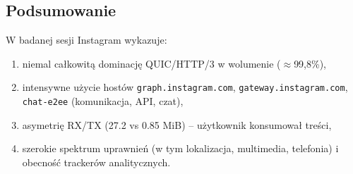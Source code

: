 \subsection{Podsumowanie}
W badanej sesji Instagram wykazuje:
\begin{enumerate}
\item niemal całkowitą dominację QUIC/HTTP/3 w wolumenie ($\approx$99,8\%),
\item intensywne użycie hostów \texttt{graph.instagram.com}, \texttt{gateway.instagram.com}, \texttt{chat-e2ee} (komunikacja, API, czat),
\item asymetrię RX/TX (27.2 vs 0.85 MiB) – użytkownik konsumował treści,
\item szerokie spektrum uprawnień (w tym lokalizacja, multimedia, telefonia) i obecność trackerów analitycznych.
\end{enumerate}
